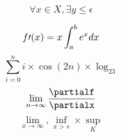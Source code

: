 \documentclass[12pt,a4paper]{article}
\begin{document}
\begin{displaymath}
\forall x \in X, \exists y \leq \epsilon
\end{displaymath}

$$f\prime(x) = x\int_a^be^xdx \\$$
$$\sum_{i=0}^n i\times\cos(2n) \times \log_23$$
$$\lim_{n\to\infty} \frac{\partialf}{\partialx}$$
$$\lim_{x \to \infty}, \inf_{x > s} \times \sup_K$$
\end{document}
